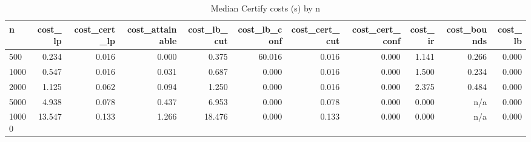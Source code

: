 \begin{table}[htbp]
\centering
\small
\caption{Median Certify costs (s) by n}
\label{tab:E6_scalability_certify_scaling}
\begin{tabular}{lrrrrrrrrrr}
\toprule
n & cost\_lp & cost\_cert\_lp & cost\_attainable & cost\_lb\_cut & cost\_lb\_conf & cost\_cert\_cut & cost\_cert\_conf & cost\_ir & cost\_bounds & cost\_lb \\
\midrule
500 & 0.234 & 0.016 & 0.000 & 0.375 & 60.016 & 0.016 & 0.000 & 1.141 & 0.266 & 0.000 \\
1000 & 0.547 & 0.016 & 0.031 & 0.687 & 0.000 & 0.016 & 0.000 & 1.500 & 0.234 & 0.000 \\
2000 & 1.125 & 0.062 & 0.094 & 1.250 & 0.000 & 0.016 & 0.000 & 2.375 & 0.484 & 0.000 \\
5000 & 4.938 & 0.078 & 0.437 & 6.953 & 0.000 & 0.078 & 0.000 & 0.000 & n/a & 0.000 \\
10000 & 13.547 & 0.133 & 1.266 & 18.476 & 0.000 & 0.133 & 0.000 & 0.000 & n/a & 0.000 \\
\bottomrule
\end{tabular}
\end{table}

